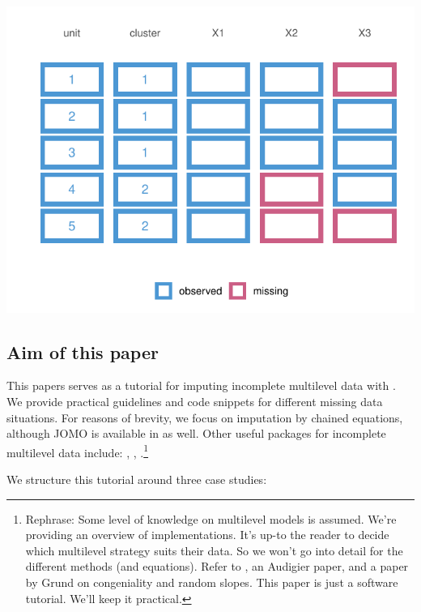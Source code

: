 \documentclass[
]{jss}
\begin{document}
\begin{CodeChunk}


\begin{center}\includegraphics{Manuscript_files/figure-latex/patterns-1} \end{center}

\end{CodeChunk}

\hypertarget{aim-of-this-paper}{%
\subsection{Aim of this paper}\label{aim-of-this-paper}}

This papers serves as a tutorial for imputing incomplete multilevel data
with . We provide practical guidelines and code snippets for
different missing data situations. For reasons of brevity, we focus on
imputation by chained equations, although JOMO is available in
 as well. Other useful packages for incomplete multilevel data
include: , , .\footnote{Rephrase:
  Some level of knowledge on multilevel models is assumed. We're
  providing an overview of implementations. It's up-to the reader to
  decide which multilevel strategy suits their data. So we won't go into
  detail for the different methods (and equations). Refer to
  \citet{meng94}, an Audigier paper, and a paper by Grund on
  congeniality and random slopes. This paper is just a software
  tutorial. We'll keep it practical.}

We structure this tutorial around three case studies:
\end{document}
